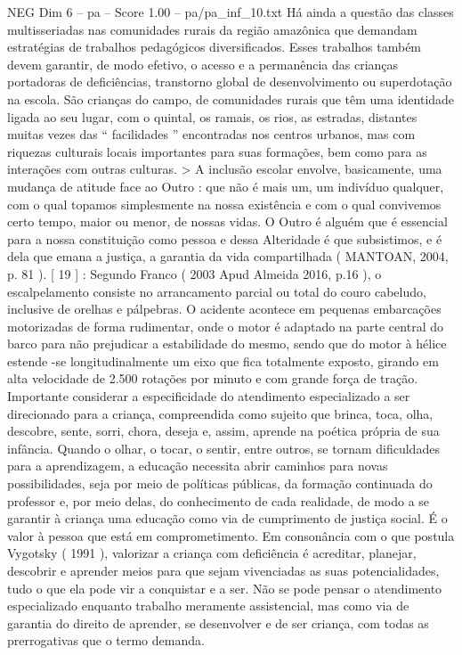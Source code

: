 \begin{textsample}{NEG Dim 6 – pa – Score 1.00 – pa/pa\_inf\_10.txt}
Há ainda a questão das classes multisseriadas nas comunidades rurais da região amazônica que demandam estratégias de trabalhos pedagógicos diversificados.
Esses trabalhos também devem garantir, de modo efetivo, o acesso e a permanência das crianças portadoras de deficiências, transtorno global de desenvolvimento ou superdotação na escola.
São crianças do campo, de comunidades rurais que têm uma identidade ligada ao seu lugar, com o quintal, os ramais, os rios, as estradas, distantes muitas vezes das “ facilidades ” encontradas nos centros urbanos, mas com riquezas culturais locais importantes para suas formações, bem como para as interações com outras culturas. > A inclusão escolar envolve, basicamente, uma mudança de atitude face ao Outro : que não é mais um, um indivíduo qualquer, com o qual topamos simplesmente na nossa existência e com o qual convivemos certo tempo, maior ou menor, de nossas vidas.
O Outro é alguém que é essencial para a nossa constituição como pessoa e dessa Alteridade é que subsistimos, e é dela que emana a justiça, a garantia da vida compartilhada ( MANTOAN, 2004, p. 81 ). [ 19 ] : Segundo Franco ( 2003 Apud Almeida 2016, p.16 ), o escalpelamento consiste no arrancamento parcial ou total do couro cabeludo, inclusive de orelhas e pálpebras.
O acidente acontece em pequenas embarcações motorizadas de forma rudimentar, onde o motor é adaptado na parte central do barco para não prejudicar a estabilidade do mesmo, sendo que do motor à hélice estende -se longitudinalmente um eixo que fica totalmente exposto, girando em alta velocidade de 2.500 rotações por minuto e com grande força de tração.
Importante considerar a especificidade do atendimento especializado a ser direcionado para a criança, compreendida como sujeito que brinca, toca, olha, descobre, sente, sorri, chora, deseja e, assim, aprende na poética própria de sua infância.
Quando o olhar, o tocar, o sentir, entre outros, se tornam dificuldades para a aprendizagem, a educação necessita abrir caminhos para novas possibilidades, seja por meio de políticas públicas, da formação continuada do professor e, por meio delas, do conhecimento de cada realidade, de modo a se garantir à criança uma educação como via de cumprimento de justiça social.
É o valor à pessoa que está em comprometimento.
Em consonância com o que postula Vygotsky ( 1991 ), valorizar a criança com deficiência é acreditar, planejar, descobrir e aprender meios para que sejam vivenciadas as suas potencialidades, tudo o que ela pode vir a conquistar e a ser.
Não se pode pensar o atendimento especializado enquanto trabalho meramente assistencial, mas como via de garantia do direito de aprender, se desenvolver e de ser criança, com todas as prerrogativas que o termo demanda.

\end{textsample}
